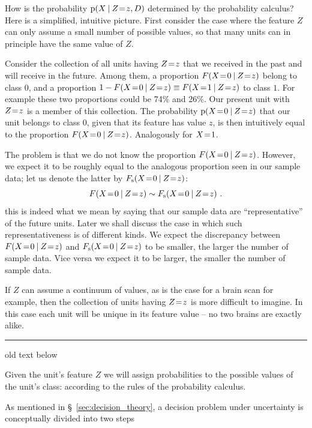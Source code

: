 \documentclass[\ifafour a4paper,12pt,\else a5paper,10pt,\fi%
onecolumn,oneside,article,%
british%
]{memoir}
\theoremstyle{remark}
\theoremstyle{innote}
\newcommand*{\p}{\mathrm{p}}%
\renewcommand*{\|}[1][]{\nonscript\:#1\vert\nonscript\:\mathopen{}}
\newcommand*{\mo}[1][=]{\mathrel{\mkern-3.5mu#1\mkern-3.5mu}}
\newcommand*{\sect}{\S}%
\newcommand{\mynote}[1]{ {\color{notecolour}#1}}
\newcommand*{\Fs}{F_{\textrm{s}}}
\begin{document}
\medskip

How is the probability $\p(X \| Z\mo z, D)$ determined by the probability calculus? Here is a simplified, intuitive picture. First consider the case where the feature $Z$ can only assume a small number of possible values, so that many units can in principle have the same value of $Z$.

Consider the collection of all units having $Z\mo z$ that we received in the past and will receive in the future. Among them, a proportion $F(X\mo 0 \| Z\mo z)$ belong to class $0$, and a proportion $1 - F(X\mo 0 \| Z\mo z) \equiv F(X\mo 1 \| Z\mo z)$ to class $1$. For example these two proportions could be 74\% and 26\%. Our present unit with $Z\mo z$ is a member of this collection. The probability $\p(X\mo 0 \| Z\mo z)$ that our unit belongs to class $0$, given that its feature has value $z$, is then intuitively equal to the proportion $F(X\mo 0 \| Z\mo z)$. Analogously for $X\mo 1$.

The problem is that we do not know the proportion $F(X\mo 0 \| Z\mo z)$. However, we expect it to be roughly equal to the analogous proportion seen in our sample data; let us denote the latter by $\Fs(X\mo 0 \| Z\mo z)$:
\begin{equation}
  \label{eq:approx_repres}
  F(X\mo 0 \| Z\mo z) \sim \Fs(X\mo 0 \| Z\mo z) \ .
\end{equation}
this is indeed what we mean by saying that our sample data are \enquote{representative} of the future units. Later we shall discuss the case in which such representativeness is of different kinds. We expect the discrepancy between $F(X\mo 0 \| Z\mo z)$ and $\Fs(X\mo 0 \| Z\mo z)$ to be smaller, the larger the number of sample data. Vice versa we expect it to be larger, the smaller the number of sample data.

If $Z$ can assume a continuum of values, as is the case for a brain scan for example, then the collection of units having $Z\mo z$ is more difficult to imagine. In this case each unit will be unique in its feature value -- no two brains are exactly alike.




\mynote{\medskip\hrule old text below}

Given the unit's feature $Z$ we will assign probabilities to the possible values of the unit's class:  according to the rules of the probability calculus.

As mentioned in \sect~\ref{sec:decision_theory}, a decision problem under uncertainty is conceptually divided into two steps 
\end{document}
